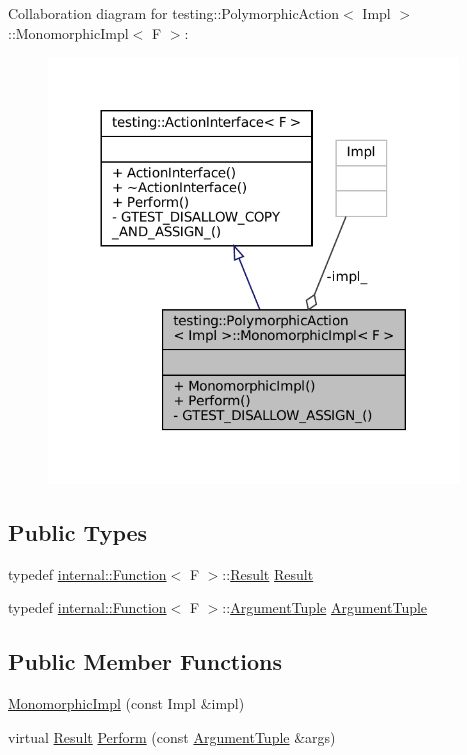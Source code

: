 Collaboration diagram for testing\+:\+:Polymorphic\+Action$<$ Impl $>$\+:\+:Monomorphic\+Impl$<$ F $>$\+:
\nopagebreak
\begin{figure}[H]
\begin{center}
\leavevmode
\includegraphics[width=308pt]{classtesting_1_1PolymorphicAction_1_1MonomorphicImpl__coll__graph}
\end{center}
\end{figure}
\subsection*{Public Types}
\begin{DoxyCompactItemize}
\item 
typedef \hyperlink{structtesting_1_1internal_1_1Function}{internal\+::\+Function}$<$ F $>$\+::\hyperlink{classtesting_1_1ActionInterface_a7477de2fe3e4e01c59db698203acaee7}{Result} \hyperlink{classtesting_1_1PolymorphicAction_1_1MonomorphicImpl_a7989da669c4c7a2da978ed78743815cb}{Result}
\item 
typedef \hyperlink{structtesting_1_1internal_1_1Function}{internal\+::\+Function}$<$ F $>$\+::\hyperlink{classtesting_1_1ActionInterface_af72720d864da4d606629e83edc003511}{Argument\+Tuple} \hyperlink{classtesting_1_1PolymorphicAction_1_1MonomorphicImpl_a2d6ef64336f1d5cdac893fb040048c8c}{Argument\+Tuple}
\end{DoxyCompactItemize}
\subsection*{Public Member Functions}
\begin{DoxyCompactItemize}
\item 
\hyperlink{classtesting_1_1PolymorphicAction_1_1MonomorphicImpl_a0f87e4646298d9fd8e7eda04a09fc6d0}{Monomorphic\+Impl} (const Impl \&impl)
\item 
virtual \hyperlink{classtesting_1_1ActionInterface_a7477de2fe3e4e01c59db698203acaee7}{Result} \hyperlink{classtesting_1_1PolymorphicAction_1_1MonomorphicImpl_af657293ae1ac638802c0fd2486ee5f5b}{Perform} (const \hyperlink{classtesting_1_1ActionInterface_af72720d864da4d606629e83edc003511}{Argument\+Tuple} \&args)
\end{DoxyCompactItemize}
